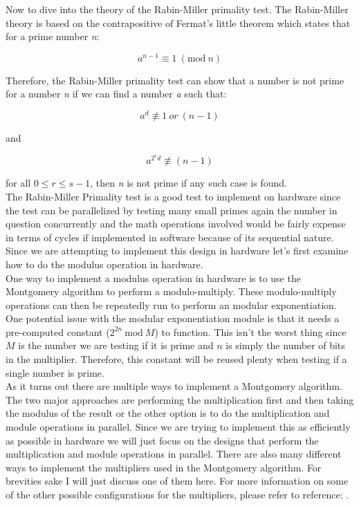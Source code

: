 \documentclass[journal]{IEEEtran}
\begin{document}
Now to dive into the theory of the Rabin-Miller primality test. The Rabin-Miller theory is based on the contrapositive of Fermat's little theorem which states that for a prime number \textit{n}:

	\begin{displaymath}
		a^{n-1} \equiv 1\ (\textrm{mod}\ n)
	\end{displaymath}

Therefore, the Rabin-Miller primality test can show that a number is not prime for a number \textit{n} if we can find a number \textit{a} such that:

	\begin{displaymath}
		a^d \not \equiv 1\ or\ (n-1)
	\end{displaymath}
		
and

	\begin{displaymath}
		a^{2^rd} \not \equiv (n-1)
	\end{displaymath}

for all $0 \le r \le s-1$, then \textit{n} is not prime if any such case is found. \cite{wiki_miller-rabin} \\

The Rabin-Miller Primality test is a good test to implement on hardware since the test can be parallelized by testing many small primes again the number in question concurrently and the math operations involved would be fairly expense in terms of cycles if implemented in software because of its sequential nature. Since we are attempting to implement this design in hardware let's first examine how to do the modulus operation in hardware. \\

One way to implement a modulus operation in hardware is to use the Montgomery algorithm to perform a modulo-multiply. These modulo-multiply operations can then be repeatedly run to perform an modular exponentiation. One potential issue with the modular exponentiation module is that it needs a pre-computed constant ($2^{2n}\ \textrm{mod}\ M$) to function. This isn't the worst thing since $M$ is the number we are testing if it is prime and $n$ is simply the number of bits in the multiplier. Therefore, this constant will be reused plenty when testing if a single number is prime. \\

As it turns out there are multiple ways to implement a Montgomery algorithm. The two major approaches are performing the multiplication first and then taking the modulus of the result or the other option is to do the multiplication and module operations in parallel. Since we are trying to implement this as efficiently as possible in hardware we will just focus on the designs that perform the multiplication and module operations in parallel. There are also many different ways to implement the multipliers used in the Montgomery algorithm. For brevities sake I will just discuss one of them here. For more information on some of the other possible configurations for the multipliers, please refer to reference: \cite{daly}. \\
\end{document}
